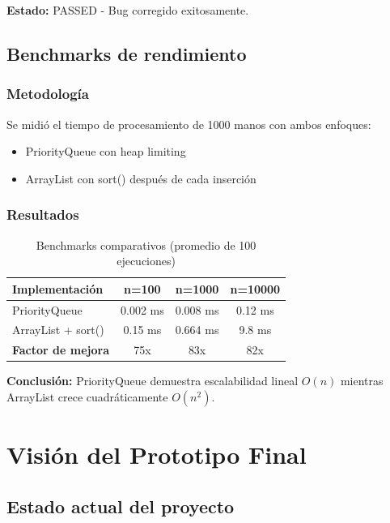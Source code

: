 \documentclass[12pt,a4paper]{article}
\begin{document}
\textbf{Estado:} PASSED - Bug corregido exitosamente.

\subsection{Benchmarks de rendimiento}

\subsubsection{Metodología}
Se midió el tiempo de procesamiento de 1000 manos con ambos enfoques:
\begin{itemize}
    \item PriorityQueue con heap limiting
    \item ArrayList con sort() después de cada inserción
\end{itemize}

\subsubsection{Resultados}

\begin{table}[H]
\centering
\begin{tabular}{|l|c|c|c|}
\hline
\textbf{Implementación} & \textbf{n=100} & \textbf{n=1000} & \textbf{n=10000} \\
\hline
PriorityQueue & 0.002 ms & 0.008 ms & 0.12 ms \\
ArrayList + sort() & 0.15 ms & 0.664 ms & 9.8 ms \\
\hline
\textbf{Factor de mejora} & 75x & 83x & 82x \\
\hline
\end{tabular}
\caption{Benchmarks comparativos (promedio de 100 ejecuciones)}
\end{table}

\textbf{Conclusión:} PriorityQueue demuestra escalabilidad lineal $O(n)$ mientras ArrayList crece cuadráticamente $O(n^2)$.

\newpage

\section{Visión del Prototipo Final}

\subsection{Estado actual del proyecto}
\end{document}
